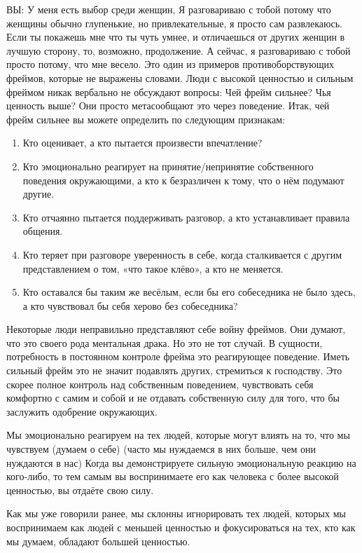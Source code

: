 ВЫ: У меня есть выбор среди женщин, Я разговариваю с тобой потому что женщины обычно глупенькие, но привлекательные, я просто сам развлекаюсь. Если ты покажешь мне что ты чуть умнее, и отличаешься от других женщин в лучшую сторону, то, возможно, продолжение. А сейчас, я разговариваю с тобой просто потому, что мне весело. Это один из примеров противоборствующих фреймов, которые не выражены словами. Люди с высокой ценностью и сильным фреймом никак вербально не обсуждают вопросы: Чей фрейм сильнее? Чья ценность выше? Они просто метасообщают это через поведение. Итак, чей фрейм сильнее вы можете определить по следующим признакам:

\begin{enumerate}
\item Кто оценивает, а кто пытается произвести впечатление?
\item Кто эмоционально реагирует на принятие/непринятие собственного поведения окружающими, а кто к безразличен к тому, что о нём подумают другие.
\item Кто отчаянно пытается поддерживать разговор, а кто устанавливает правила общения.
\item Кто теряет при разговоре уверенность в себе, когда сталкивается с другим представлением о том, «что такое клёво», а кто не меняется.
\item Кто оставался бы таким же весёлым, если бы его собеседника не было здесь, а кто чувствовал бы себя херово без собеседника?
\end{enumerate}

Некоторые люди неправильно представляют себе войну фреймов. Они думают, что это своего рода ментальная драка. Но это не тот случай. В сущности, потребность в постоянном контроле фрейма это реагирующее поведение. Иметь сильный фрейм это не значит подавлять других, стремиться к господству. Это скорее полное контроль над собственным поведением, чувствовать себя комфортно с самим и собой и не отдавать собственную силу для того, что бы заслужить одобрение окружающих.

\RULE  Мы эмоционально реагируем на тех людей, которые могут влиять на то, что мы чувствуем (думаем о себе) (часто мы нуждаемся в них больше, чем они нуждаются в нас) Когда вы демонстрируете сильную эмоциональную реакцию на кого-либо, то тем самым вы воспринимаете его как человека с более высокой ценностью, вы отдаёте свою силу.

Как мы уже говорили ранее, мы склонны игнорировать тех людей, которых мы воспринимаем как людей с меньшей ценностью и фокусироваться на тех, кто как мы думаем, обладают большей ценностью.

